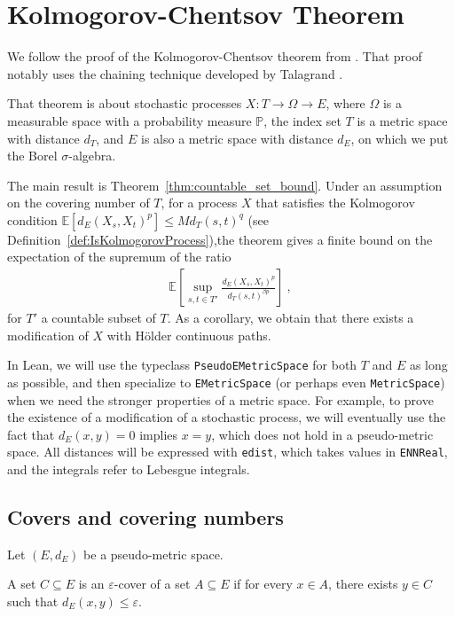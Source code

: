 \chapter{Kolmogorov-Chentsov Theorem}
\label{chap:kolmogorov_chentsov}

We follow the proof of the Kolmogorov-Chentsov theorem from \cite{kratschmer2023kolmogorov}.
That proof notably uses the chaining technique developed by Talagrand \cite{talagrand2022upper}.

That theorem is about stochastic processes $X : T \to \Omega \to E$, where $\Omega$ is a measurable space with a probability measure $\mathbb{P}$, the index set $T$ is a metric space with distance $d_T$, and $E$ is also a metric space with distance $d_E$, on which we put the Borel $\sigma$-algebra.

The main result is Theorem~\ref{thm:countable_set_bound}.
Under an assumption on the covering number of $T$, for a process $X$ that satisfies the Kolmogorov condition $\mathbb{E}[d_E(X_s, X_t)^p] \le M d_T(s, t)^q$ (see Definition~\ref{def:IsKolmogorovProcess}),the theorem gives a finite bound on the expectation of the supremum of the ratio
\begin{align*}
  \mathbb{E}\left[ \sup_{s, t \in T'} \frac{d_E(X_s, X_t)^p}{d_T(s, t)^{\beta p}} \right]
  \: ,
\end{align*}
for $T'$ a countable subset of $T$.
As a corollary, we obtain that there exists a modification of $X$ with Hölder continuous paths.

In Lean, we will use the typeclass \texttt{PseudoEMetricSpace} for both $T$ and $E$ as long as possible, and then specialize to \texttt{EMetricSpace} (or perhaps even \texttt{MetricSpace}) when we need the stronger properties of a metric space.
For example, to prove the existence of a modification of a stochastic process, we will eventually use the fact that $d_E(x, y) = 0$ implies $x = y$, which does not hold in a pseudo-metric space.
All distances will be expressed with \texttt{edist}, which takes values in \texttt{ENNReal}, and the integrals refer to Lebesgue integrals.

\section{Covers and covering numbers}

Let $(E, d_E)$ be a pseudo-metric space.

\begin{definition}\label{def:IsCover}
  \mathlibok
  A set $C \subseteq E$ is an $\varepsilon$-cover of a set $A \subseteq E$ if for every $x \in A$, there exists $y \in C$ such that $d_E(x, y) \le \varepsilon$.
\end{definition}


